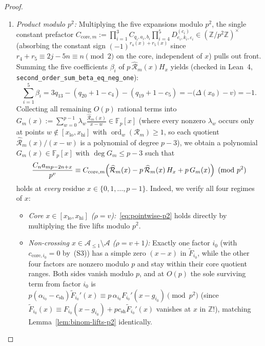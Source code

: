 \documentclass[11pt,reqno]{amsart}
\theoremstyle{definition}
\theoremstyle{remark}
\newcommand{\ZZ}{\mathbb{Z}}
\newcommand{\FF}{\mathbb{F}}
\newcommand{\ord}{\operatorname{ord}}
\begin{document}
\begin{proof}
\begin{enumerate}
\begin{itemize}
\begin{equation}
    \end{equation}
  \end{itemize}
  Crucially, in both cases every pole $w$ appearing on the right-hand side of~\eqref{eq:H-shift}--\eqref{eq:H-shift-hi} lies strictly outside $[x_{\mathrm{lo}}, x_{\mathrm{hi}}]$, and therefore satisfies $\ord_w(\mathcal{R}_m) \ge 1$, i.e., $(x - w) \mid \widehat{\mathcal{R}}_m(x)$ in $\FF_p[x]$.
  \item \emph{Product modulo $p^2$:} Multiplying the five expansions modulo $p^2$, the single constant prefactor $C_{\mathrm{core}, m} := \prod_{i=1}^3 C_{q_i, a_i, b_i} \prod_{i=4}^5 D^{(c_i)}_{e_i, k_i, \varepsilon_i} \in (\ZZ/p^2\ZZ)^\times$ (absorbing the constant sign $(-1)^{r_4(x) + r_5(x)}$ since $r_4 + r_5 \equiv 2j - 5n \equiv n \pmod 2$ on the core, independent of $x$) pulls out front. Summing the five coefficients $\beta_i$ of $p\,\widehat{\mathcal{R}}_m(x) H_x$ yields (checked in Lean~4, \texttt{second\_order\_sum\_beta\_eq\_neg\_one}):
  \begin{equation}
  \label{eq:sum-beta}
    \sum_{i=1}^{5} \beta_i
    = 3 q_{13} - (q_{20} + 1 - c_4) - (q_{19} + 1 - c_5)
    = -\bigl(\Delta(x_0) - v\bigr) = -1.
  \end{equation}
  Collecting all remaining $O(p)$ rational terms into $G_m(x) := \sum_{w=0}^{p-1} \lambda_w \frac{\widehat{\mathcal{R}}_m(x)}{x - w} \in \FF_p[x]$ (where every nonzero $\lambda_w$ occurs only at points $w \notin [x_{\mathrm{lo}}, x_{\mathrm{hi}}]$ with $\ord_w(\mathcal{R}_m) \ge 1$, so each quotient $\widehat{\mathcal{R}}_m(x)/(x - w)$ is a polynomial of degree $p - 3$), we obtain a polynomial $G_m(x) \in \FF_p[x]$ with $\deg G_m \le p - 3$ such that
  \begin{equation}
  \label{eq:pointwise-p2}
    \frac{C_n a_{mp - 2n + x}}{p^v}
    \equiv C_{\mathrm{core}, m}\Bigl(\widehat{\mathcal{R}}_m(x) - p\,\widehat{\mathcal{R}}_m(x)\, H_x + p\, G_m(x)\Bigr) \pmod{p^2}
  \end{equation}
  holds at \emph{every} residue $x \in \{0, 1, \ldots, p - 1\}$. Indeed, we verify all four regimes of $x$:
  \begin{itemize}
    \item \emph{Core $x \in [x_{\mathrm{lo}}, x_{\mathrm{hi}}]$ ($\rho = v$):}~\eqref{eq:pointwise-p2} holds directly by multiplying the five lifts modulo $p^2$.
    \item \emph{Non-crossing $x \in \mathcal{A}_{\le 1} \setminus \mathcal{A}$ ($\rho = v + 1$):} Exactly one factor $i_0$ (with $c_{\mathrm{core}, i_0} = 0$ by~(S3)) has a simple zero $(x - x)$ in $\widetilde{F}_{i_0}$, while the other four factors are nonzero modulo $p$ and stay within their core quotient ranges. Both sides vanish modulo $p$, and at $O(p)$ the sole surviving term from factor $i_0$ is $p(\alpha_{i_0} - c_{\mathrm{sh}})\widetilde{F}_{i_0}'(x) \equiv p\,\alpha_{i_0} F_{i_0}'(x - g_{i_0}) \pmod{p^2}$ (since $\widetilde{F}_{i_0}(x) \equiv F_{i_0}(x - g_{i_0}) + p c_{\mathrm{sh}}\widetilde{F}_{i_0}'(x)$ vanishes at $x$ in $\ZZ$!), matching Lemma~\ref{lem:binom-lifts-p2} identically.

\end{itemize}
\end{enumerate}
\end{proof}
\end{document}
